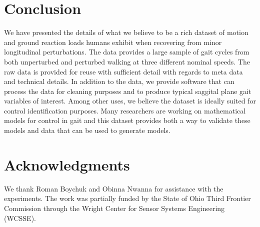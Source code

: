 \documentclass{article}
\begin{document}
\section{Conclusion}

We have presented the details of what we believe to be a rich dataset of motion
and ground reaction loads humans exhibit when recovering from minor
longitudinal perturbations. The data provides a large sample of gait cycles
from both unperturbed and perturbed walking at three different nominal speeds.
The raw data is provided for reuse with sufficient detail with regards to meta
data and technical details. In addition to the data, we provide software that
can process the data for cleaning purposes and to produce typical saggital
plane gait variables of interest. Among other uses, we believe the dataset is
ideally suited for control identification purposes. Many researchers are
working on mathematical models for control in gait and this dataset provides
both a way to validate these models and data that can be used to generate
models.

\section{Acknowledgments}
We thank Roman Boychuk and Obinna Nwanna for assistance with the experiments.  The work was partially funded by the
State of Ohio Third Frontier Commission through the Wright Center for Sensor Systems Engineering (WCSSE).
\end{document}
